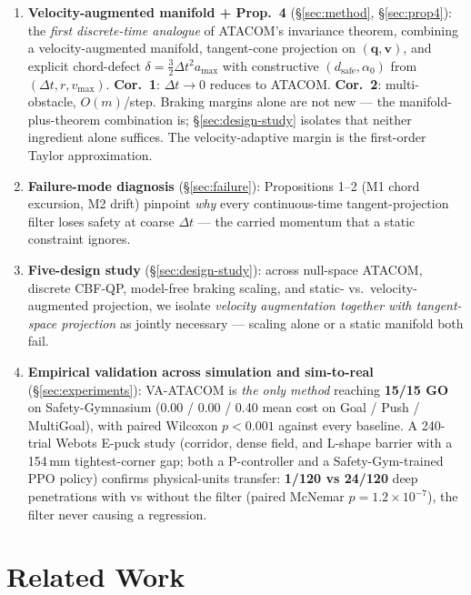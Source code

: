 \documentclass[letterpaper]{article}
\begin{document}
\begin{enumerate}
\item \textbf{Velocity-augmented manifold + Prop.~4} (\S\ref{sec:method}, \S\ref{sec:prop4}): the \emph{first discrete-time analogue} of ATACOM's invariance theorem, combining a velocity-augmented manifold, tangent-cone projection on $(\boldsymbol q,\boldsymbol v)$, and explicit chord-defect $\delta{=}\tfrac{3}{2}\Delta t^2 a_{\max}$ with constructive $(d_\text{safe},\alpha_0)$ from $(\Delta t,r,v_{\max})$. \textbf{Cor.~1}: $\Delta t\to0$ reduces to ATACOM. \textbf{Cor.~2}: multi-obstacle, $O(m)$/step. Braking margins alone are not new --- the manifold-plus-theorem combination is; \S\ref{sec:design-study} isolates that neither ingredient alone suffices. The velocity-adaptive margin is the first-order Taylor approximation.

\item \textbf{Failure-mode diagnosis} (\S\ref{sec:failure}): Propositions 1--2 (M1 chord excursion, M2 drift) pinpoint \emph{why} every continuous-time tangent-projection filter loses safety at coarse $\Delta t$ --- the carried momentum that a static constraint ignores.

\item \textbf{Five-design study} (\S\ref{sec:design-study}): across null-space ATACOM, discrete CBF-QP, model-free braking scaling, and static- vs.\ velocity-augmented projection, we isolate \emph{velocity augmentation together with tangent-space projection} as jointly necessary --- scaling alone or a static manifold both fail.

\item \textbf{Empirical validation across simulation and sim-to-real} (\S\ref{sec:experiments}): VA-ATACOM is \emph{the only method} reaching \textbf{15/15 GO} on Safety-Gymnasium (0.00 / 0.00 / 0.40 mean cost on Goal / Push / MultiGoal), with paired Wilcoxon $p\!<\!0.001$ against every baseline. A 240-trial Webots E-puck study (corridor, dense field, and L-shape barrier with a 154\,mm tightest-corner gap; both a P-controller and a Safety-Gym-trained PPO policy) confirms physical-units transfer: \textbf{1/120 vs 24/120} deep penetrations with vs without the filter (paired McNemar $p{=}1.2{\times}10^{-7}$), the filter never causing a regression.
\end{enumerate}

\section{Related Work}
\end{document}
